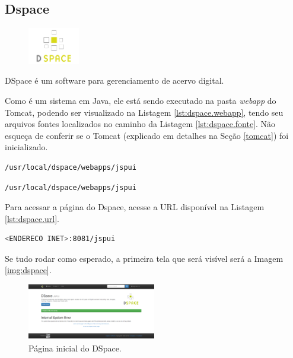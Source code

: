 \subsection{Dspace}\label{dspace}

\begin{figure} %
    \centering
    \includegraphics[width=0.2\textwidth]{../images/dspace.png}
\end{figure}
DSpace é um software para gerenciamento de acervo digital.

Como é um sistema em Java, ele está sendo executado na pasta \textit{webapp} do Tomcat, podendo ser visualizado na Listagem \ref{lst:dspace.webapp}, tendo seu arquivos fontes localizados no caminho da Listagem \ref{lst:dspace.fonte}. Não esqueça de conferir se o Tomcat (explicado em detalhes na Seção \ref{tomcat}) foi inicializado.

\begin{lstlisting}[language=bash, label=lst:dspace.webapp, caption=Onde o Dspace é executado.]
    /usr/local/dspace/webapps/jspui
\end{lstlisting}

\begin{lstlisting}[language=bash, label=lst:dspace.fonte, caption=Onde os arquivos fonte do Dspace estão.]
    /usr/local/dspace/webapps/jspui
\end{lstlisting}


Para acessar a página do Dspace, acesse a URL disponível na Listagem \ref{lst:dspace.url}.

\begin{lstlisting}[language=bash, label=lst:dspace.url, caption=Acessando o Dspace.]
    <ENDERECO INET>:8081/jspui
\end{lstlisting}

Se tudo rodar como esperado, a primeira tela que será visível será a Imagem \ref{img:dspace}.

\begin{figure}[H]
    \centering
    \includegraphics[width=0.5\textwidth]{../images/dspace2.png}
    \caption{Página inicial do DSpace.}
    \label{fig:dspace}
\end{figure}


